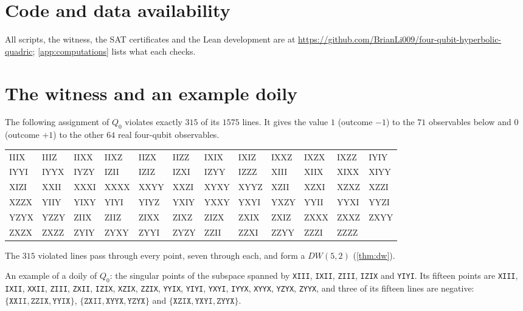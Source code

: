 \documentclass[11pt]{article}
\theoremstyle{definition}
\theoremstyle{remark}
\newcommand{\obs}[1]{\texttt{#1}}
\newcommand{\repo}{\url{https://github.com/BrianLi009/four-qubit-hyperbolic-quadric}}
\begin{document}
\section*{Code and data availability}
All scripts, the witness, the SAT certificates and the Lean development are at \repo; \cref{app:computations} lists what each checks.

\appendix

\section{The witness and an example doily}\label{app:witness}
The following assignment of $Q_0$ violates exactly $315$ of its $1575$ lines. It gives the value $1$ (outcome $-1$) to the $71$ observables below and $0$ (outcome $+1$) to the other $64$ real four-qubit observables.
\begin{center}
\small\ttfamily
\begin{tabular}{@{}*{12}{l}@{}}
IIIX & IIIZ & IIXX & IIXZ & IIZX & IIZZ & IXIX & IXIZ & IXXZ & IXZX & IXZZ & IYIY \\
IYYI & IYYX & IYZY & IZII & IZIZ & IZXI & IZYY & IZZZ & XIII & XIIX & XIXX & XIYY \\
XIZI & XXII & XXXI & XXXX & XXYY & XXZI & XYXY & XYYZ & XZII & XZXI & XZXZ & XZZI \\
XZZX & YIIY & YIXY & YIYI & YIYZ & YXIY & YXXY & YXYI & YXZY & YYII & YYXI & YYZI \\
YZYX & YZZY & ZIIX & ZIIZ & ZIXX & ZIXZ & ZIZX & ZXIX & ZXIZ & ZXXX & ZXXZ & ZXYY \\
ZXZX & ZXZZ & ZYIY & ZYXY & ZYYI & ZYZY & ZZII & ZZXI & ZZYY & ZZZI & ZZZZ &
\end{tabular}
\end{center}
The $315$ violated lines pass through every point, seven through each, and form a $DW(5,2)$ (\cref{thm:dw}).

An example of a doily of $Q_0$: the singular points of the subspace spanned by \obs{XIII}, \obs{IXII}, \obs{ZIII}, \obs{IZIX} and \obs{YIYI}. Its fifteen points are
\obs{XIII}, \obs{IXII}, \obs{XXII}, \obs{ZIII}, \obs{ZXII}, \obs{IZIX}, \obs{XZIX}, \obs{ZZIX}, \obs{YYIX}, \obs{YIYI}, \obs{YXYI}, \obs{IYYX}, \obs{XYYX}, \obs{YZYX}, \obs{ZYYX},
and three of its fifteen lines are negative: $\{\obs{XXII},\obs{ZZIX},\obs{YYIX}\}$, $\{\obs{ZXII},\obs{XYYX},\obs{YZYX}\}$ and $\{\obs{XZIX},\obs{YXYI},\obs{ZYYX}\}$.
\end{document}
